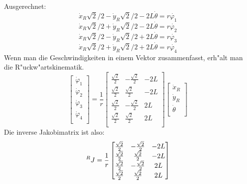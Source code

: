 \documentclass[11pt]{article}
\begin{document}
    Ausgerechnet:
    \begin{equation}
        \dot{x}_{R}\sqrt{2}/2 - \dot{y}_{R}\sqrt{2}/2 - 2L\dot{\theta} = r\dot{\varphi_{1}}\label{eq:calc1}
    \end{equation}
    \begin{equation}
        \dot{x}_{R}\sqrt{2}/2 + \dot{y}_{R}\sqrt{2}/2 - 2L\dot{\theta} = r\dot{\varphi_{2}}\label{eq:calc2}
    \end{equation}
    \begin{equation}
        \dot{x}_{R}\sqrt{2}/2 - \dot{y}_{R}\sqrt{2}/2 + 2L\dot{\theta} = r\dot{\varphi_{3}}\label{eq:calc3}
    \end{equation}
    \begin{equation}
        \dot{x}_{R}\sqrt{2}/2 + \dot{y}_{R}\sqrt{2}/2 + 2L\dot{\theta} = r\dot{\varphi_{4}}\label{eq:calc4}
    \end{equation}
    Wenn man die Geschwindigkeiten in einem Vektor zusammenfasst, erh"alt man die R"uckw"artskinematik.
    \begin{equation}
        \begin{bmatrix}
            \dot{\varphi}_{1} \\
            \dot{\varphi}_{2} \\
            \dot{\varphi}_{3} \\
            \dot{\varphi}_{4} \\
        \end{bmatrix}\label{eq:rueck} = \frac{1}{r}
        \begin{bmatrix}
            \frac{\sqrt{2}}{2} & -\frac{\sqrt{2}}{2} & -2L \\
            \frac{\sqrt{2}}{2} & \frac{\sqrt{2}}{2} & -2L \\
            \frac{\sqrt{2}}{2} & -\frac{\sqrt{2}}{2} & 2L \\
            \frac{\sqrt{2}}{2} & \frac{\sqrt{2}}{2} & 2L \\
        \end{bmatrix}
        \begin{bmatrix}
            \dot{x}_{R} \\
            \dot{y}_{R} \\
            \dot{\theta} \\
        \end{bmatrix}
    \end{equation}
    Die inverse Jakobimatrix ist also:
    \begin{equation}
        \prescript{R}{}{J} = \frac{1}{r}
        \begin{bmatrix}
            \frac{\sqrt{2}}{2} & -\frac{\sqrt{2}}{2} & -2L \\
            \frac{\sqrt{2}}{2} & \frac{\sqrt{2}}{2} & -2L \\
            \frac{\sqrt{2}}{2} & -\frac{\sqrt{2}}{2} & 2L \\
            \frac{\sqrt{2}}{2} & \frac{\sqrt{2}}{2} & 2L \\
        \end{bmatrix}\label{eq:jakobi}
    \end{equation}
\end{document}
